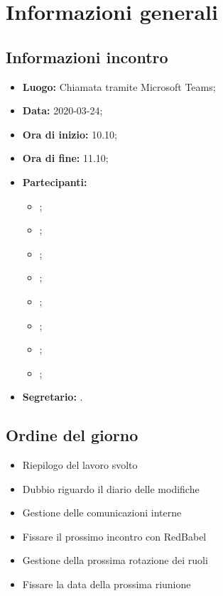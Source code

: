 \section{Informazioni generali}
\subsection{Informazioni incontro}
\begin{itemize}
	\item \textbf{Luogo:} Chiamata tramite Microsoft Teams; 
	\item \textbf{Data:} 2020-03-24;
	\item \textbf{Ora di inizio:} 10.10; 
	\item \textbf{Ora di fine:} 11.10; 
	\item \textbf{Partecipanti:}
		\begin{itemize}
			\item \VB; 
			\item \LB; 
			\item \NF; 
			\item \EG; 
			\item \FJ; 
			\item \MP; 
			\item \AS; 
			\item \AZ; 
		\end{itemize}
	\item \textbf{Segretario:} \MP. 
\end{itemize}

\subsection{Ordine del giorno}
\begin{itemize}
	\item Riepilogo del lavoro svolto
	\item Dubbio riguardo il diario delle modifiche
	\item Gestione delle comunicazioni interne
	\item Fissare il prossimo incontro con RedBabel
	\item Gestione della prossima rotazione dei ruoli
	\item Fissare la data della prossima riunione
\end{itemize}
